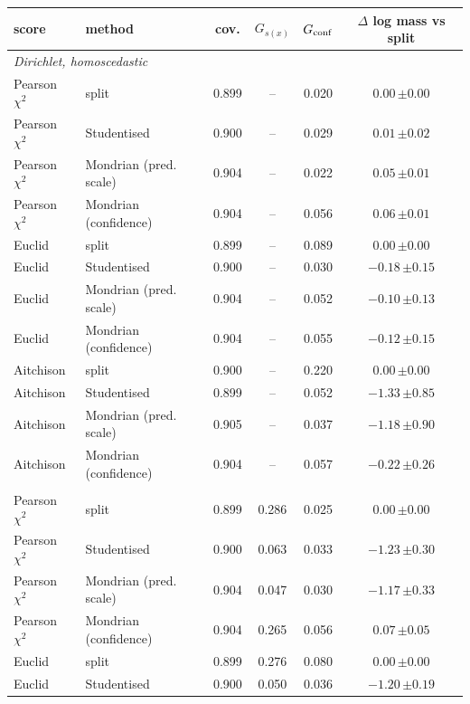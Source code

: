 \begin{tabular}{llcccc}\toprule
score & method & cov. & $G_{s(x)}$ & $G_{\rm conf}$ & $\Delta$ log mass vs split\\\midrule
\multicolumn{6}{l}{\emph{Dirichlet, homoscedastic}}\\
Pearson $\chi^2$ & split & 0.899 & -- & 0.020 & $0.00\,{\scriptstyle\pm0.00}$\\
Pearson $\chi^2$ & Studentised & 0.900 & -- & 0.029 & $0.01\,{\scriptstyle\pm0.02}$\\
Pearson $\chi^2$ & Mondrian (pred. scale) & 0.904 & -- & 0.022 & $0.05\,{\scriptstyle\pm0.01}$\\
Pearson $\chi^2$ & Mondrian (confidence) & 0.904 & -- & 0.056 & $0.06\,{\scriptstyle\pm0.01}$\\
Euclid & split & 0.899 & -- & 0.089 & $0.00\,{\scriptstyle\pm0.00}$\\
Euclid & Studentised & 0.900 & -- & 0.030 & $-0.18\,{\scriptstyle\pm0.15}$\\
Euclid & Mondrian (pred. scale) & 0.904 & -- & 0.052 & $-0.10\,{\scriptstyle\pm0.13}$\\
Euclid & Mondrian (confidence) & 0.904 & -- & 0.055 & $-0.12\,{\scriptstyle\pm0.15}$\\
Aitchison & split & 0.900 & -- & 0.220 & $0.00\,{\scriptstyle\pm0.00}$\\
Aitchison & Studentised & 0.899 & -- & 0.052 & $-1.33\,{\scriptstyle\pm0.85}$\\
Aitchison & Mondrian (pred. scale) & 0.905 & -- & 0.037 & $-1.18\,{\scriptstyle\pm0.90}$\\
Aitchison & Mondrian (confidence) & 0.904 & -- & 0.057 & $-0.22\,{\scriptstyle\pm0.26}$\\
\addlinespace[2pt]
\multicolumn{6}{l}{\emph{Dirichlet, heteroscedastic}}\\
Pearson $\chi^2$ & split & 0.899 & 0.286 & 0.025 & $0.00\,{\scriptstyle\pm0.00}$\\
Pearson $\chi^2$ & Studentised & 0.900 & 0.063 & 0.033 & $-1.23\,{\scriptstyle\pm0.30}$\\
Pearson $\chi^2$ & Mondrian (pred. scale) & 0.904 & 0.047 & 0.030 & $-1.17\,{\scriptstyle\pm0.33}$\\
Pearson $\chi^2$ & Mondrian (confidence) & 0.904 & 0.265 & 0.056 & $0.07\,{\scriptstyle\pm0.05}$\\
Euclid & split & 0.899 & 0.276 & 0.080 & $0.00\,{\scriptstyle\pm0.00}$\\
Euclid & Studentised & 0.900 & 0.050 & 0.036 & $-1.20\,{\scriptstyle\pm0.19}$\\

\end{tabular}
